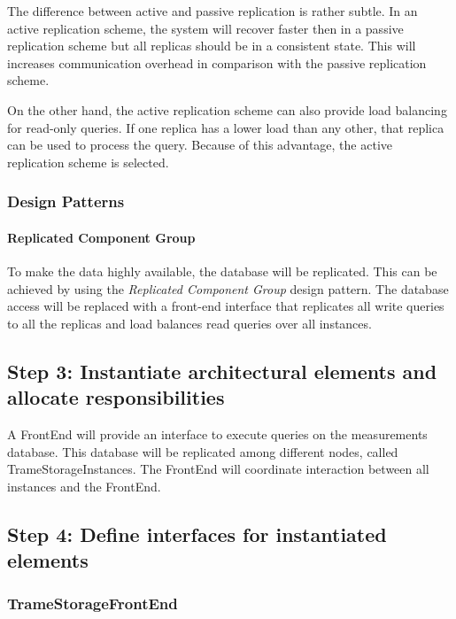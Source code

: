 \npar The difference between active and passive replication is rather subtle.
In an active replication scheme, the system will recover faster then in a
passive replication scheme but all replicas should be in a consistent
state. This will increases communication overhead in comparison with the
passive replication scheme.

\npar On the other hand, the active replication scheme can also provide load
balancing for read-only queries. If one replica has a lower load than any other,
that replica can be used to process the query. Because of this advantage, the
active replication scheme is selected.

\subsubsection{Design Patterns}
\label{add:it4/patterns}

\paragraph{Replicated Component Group} 

\npar To make the data highly available, the database will be replicated. This
can be achieved by using the \emph{Replicated Component Group} design pattern.
The database access will be replaced with a front-end interface that replicates
all write queries to all the replicas and load balances read queries over all
instances.

\subsection{Step 3: Instantiate architectural elements and allocate responsibilities}
\label{add:it4/elements}

\npar A FrontEnd will provide an interface to execute queries on the
measurements database. This database will be replicated among different nodes,
called TrameStorageInstances. The FrontEnd will coordinate interaction between
all instances and the FrontEnd.


\subsection{Step 4: Define interfaces for instantiated elements}
\label{add:it4/interfaces}

\subsubsection{TrameStorageFrontEnd}

